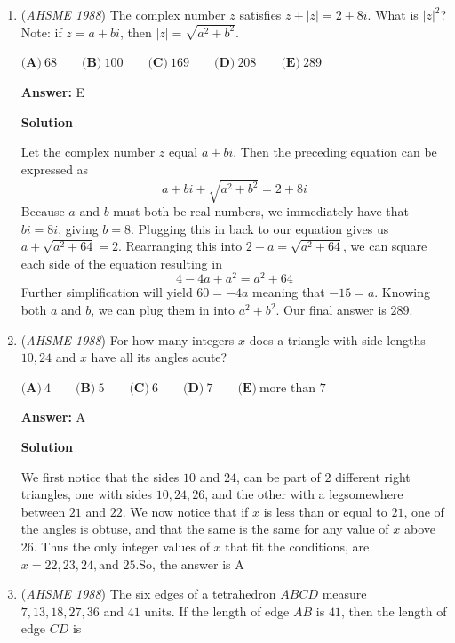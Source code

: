 \begin{enumerate}
 


	\item (\textit{AHSME 1988}) The complex number $z$ satisfies $z + |z| = 2 + 8i$. What is $|z|^{2}$? Note: if $z = a + bi$, then $|z| = \sqrt{a^{2} + b^{2}}$.


 $\textbf{(A)}\ 68\qquad \textbf{(B)}\ 100\qquad \textbf{(C)}\ 169\qquad \textbf{(D)}\ 208\qquad \textbf{(E)}\ 289$

 \textbf{Answer: }E



\textbf{Solution}

Let the complex number $z$ equal $a+bi$. Then the preceding equation can be expressed as 
 \[a+bi+\sqrt{a^2+b^2} = 2+8i\] Because $a$ and $b$ must both be real numbers, we immediately have that $bi = 8i$, giving $b = 8$. Plugging this in back to our equation gives us $a+\sqrt{a^2+64} = 2$.  Rearranging this into $2-a = \sqrt{a^2+64}$, we can square each side of the equation resulting in 
 \[4-4a+a^2 = a^2+64\] Further simplification will yield  $60 = -4a$ meaning that $-15 = a$. Knowing both $a$ and $b$, we can plug them in into $a^2+b^2$. Our final answer is $\boxed{289}$.

 


	\item (\textit{AHSME 1988}) For how many integers $x$ does a triangle with side lengths $10, 24$ and $x$ have all its angles acute?


 $\textbf{(A)}\ 4\qquad \textbf{(B)}\ 5\qquad \textbf{(C)}\ 6\qquad \textbf{(D)}\ 7\qquad \textbf{(E)}\ \text{more than } 7$

 \textbf{Answer: }A



\textbf{Solution}

We first notice that the sides $10$ and $24$, can be part of $2$ different right triangles, one with sides $10,24,26$, and the other with a legsomewhere between $21$ and $22$. We now notice that if $x$ is less than or equal to $21$, one of the angles is obtuse, and that the same is the same for any value of $x$ above $26$. Thus the only integer values of $x$ that fit the conditions, are $x=22, 23, 24, \text{and }25.$So, the answer is $\boxed{\text{A}}$



	\item (\textit{AHSME 1988}) The six edges of a tetrahedron $ABCD$ measure $7, 13, 18, 27, 36$ and $41$ units. If the length of edge $AB$ is $41$, then the length of edge $CD$ is



\end{enumerate}
